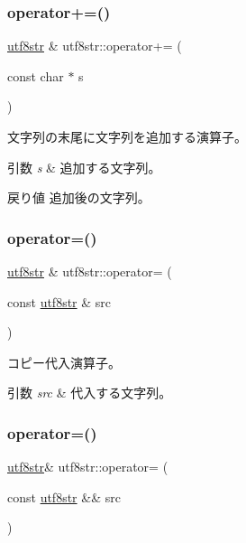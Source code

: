 \subsubsection{\texorpdfstring{operator+=()}{operator+=()}\hspace{0.1cm}{\footnotesize\ttfamily [2/2]}}
{\footnotesize\ttfamily \hyperlink{classutf8str}{utf8str} \& utf8str\+::operator+= (\begin{DoxyParamCaption}\item[{const char $\ast$}]{s }\end{DoxyParamCaption})}

文字列の末尾に文字列を追加する演算子。 
\begin{DoxyParams}{引数}
{\em s} & 追加する文字列。 \\
\hline
\end{DoxyParams}
\begin{DoxyReturn}{戻り値}
追加後の文字列。 
\end{DoxyReturn}
\hypertarget{classutf8str_aaff3c4e6bb3aad1659a640194b6f2a6a}{}\label{classutf8str_aaff3c4e6bb3aad1659a640194b6f2a6a} 
\subsubsection{\texorpdfstring{operator=()}{operator=()}\hspace{0.1cm}{\footnotesize\ttfamily [1/3]}}
{\footnotesize\ttfamily \hyperlink{classutf8str}{utf8str} \& utf8str\+::operator= (\begin{DoxyParamCaption}\item[{const \hyperlink{classutf8str}{utf8str} \&}]{src }\end{DoxyParamCaption})}

コピー代入演算子。 
\begin{DoxyParams}{引数}
{\em src} & 代入する文字列。 \\
\hline
\end{DoxyParams}
\hypertarget{classutf8str_addf2fa65d4592e247b5bbd8d500eaa1a}{}\label{classutf8str_addf2fa65d4592e247b5bbd8d500eaa1a} 
\subsubsection{\texorpdfstring{operator=()}{operator=()}\hspace{0.1cm}{\footnotesize\ttfamily [2/3]}}
{\footnotesize\ttfamily \hyperlink{classutf8str}{utf8str}\& utf8str\+::operator= (\begin{DoxyParamCaption}\item[{const \hyperlink{classutf8str}{utf8str} \&\&}]{src }\end{DoxyParamCaption})\hspace{0.3cm}{\ttfamily [delete]}}

